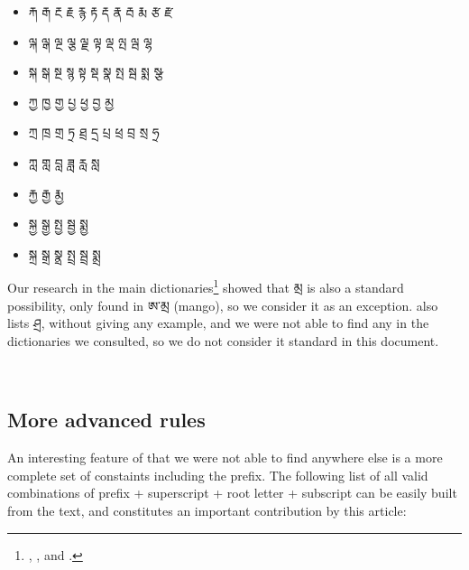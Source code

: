 \documentclass[%
a4paper,%
pagesize,%
12pt,%
parskip=off,%
bibliography=totoc,%
numbers=noenddot,%
DIV=12,%
twoside=semi,%
headings=normal%
]{scrartcl}
\begin{document}
\begin{itemize}
\item རྐ རྒ རྔ རྗ རྙ རྟ རྡ རྣ རྦ རྨ རྩ རྫ
\item ལྐ ལྒ ལྔ ལྕ ལྗ ལྟ ལྡ ལྤ ལྦ ལྷ
\item སྐ སྒ སྔ སྙ སྟ སྡ སྣ སྤ སྦ སྨ སྩ
\item ཀྱ ཁྱ གྱ པྱ ཕྱ བྱ མྱ
\item ཀྲ ཁྲ གྲ ཏྲ ཐྲ དྲ པྲ ཕྲ བྲ སྲ ཧྲ
\item ཀླ གླ བླ ཟླ རླ སླ
\item རྐྱ རྒྱ རྨྱ
\item སྐྱ སྒྱ སྤྱ སྦྱ སྨྱ
\item སྐྲ སྒྲ སྣྲ སྤྲ སྦྲ སྨྲ
\end{itemize} 

Our research in the main dictionaries\footnote{\cite{DorjeDagyig}, \cite{YisunTsikchen}, \cite{MonlamGrandDict} and \cite{DungkarEncyclopedia}.} showed that མྲ is also a standard possibility, only found in ཨ་མྲ (mango), so we consider it as an exception. \cite{TournadreMST} also lists ཤྲ, without giving any example, and we were not able to find any in the dictionaries we consulted, so we do not consider it standard in this document.

­\subsection{More advanced rules}

An interesting feature of \cite{TsheshabGrammarTopics} that we were not able to find anywhere else is a more complete set of constaints including the prefix. The following list of all valid combinations of prefix + superscript + root letter + subscript can be easily built from the text, and constitutes an important contribution by this article:
\end{document}
